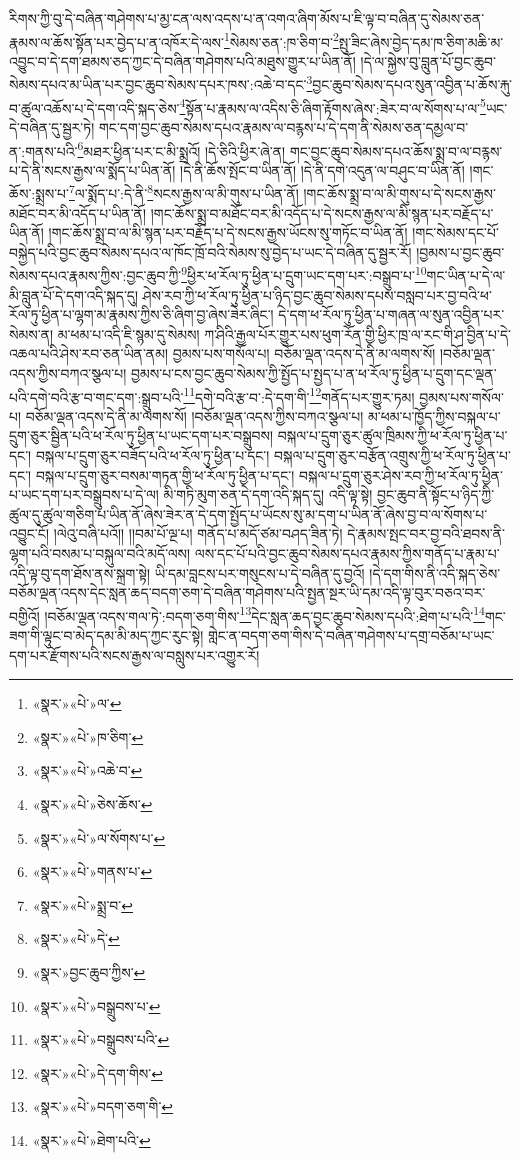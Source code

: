 རིགས་ཀྱི་བུ་དེ་བཞིན་གཤེགས་པ་མྱ་ངན་ལས་འདས་པ་ན་འགའ་ཞིག་མོས་པ་ཇི་ལྟ་བ་བཞིན་དུ་སེམས་ཅན་རྣམས་ལ་ཆོས་སྟོན་པར་བྱེད་པ་ན་འཁོར་དེ་ལས་\footnote{«སྣར་»«པེ་»ལ་}སེམས་ཅན་:ཁ་ཅིག་བ་\footnote{«སྣར་»«པེ་»ཁ་ཅིག་}སྤུ་ཟིང་ཞེས་བྱེད་དམ་ཁ་ཅིག་མཆི་མ་འབྱུང་བ་དེ་དག་ཐམས་ཅད་ཀྱང་དེ་བཞིན་གཤེགས་པའི་མཐུས་གྱུར་པ་ཡིན་ནོ། །དེ་ལ་སྐྱེས་བུ་བླུན་པོ་བྱང་ཆུབ་སེམས་དཔའ་མ་ཡིན་པར་བྱང་ཆུབ་སེམས་དཔར་ཁས་:འཆེ་བ་དང་\footnote{«སྣར་»«པེ་»འཆེ་བ་}བྱང་ཆུབ་སེམས་དཔའ་སུན་འབྱིན་པ་ཆོས་རྐུ་བ་ཚུལ་འཆོས་པ་དེ་དག་འདི་སྐད་ཅེས་\footnote{«སྣར་»«པེ་»ཅེས་ཆོས་}སྟོན་པ་རྣམས་ལ་འདིས་ཅི་ཞིག་རྟོགས་ཞེས་:ཟེར་བ་ལ་སོགས་པ་ལ་\footnote{«སྣར་»«པེ་»ལ་སོགས་པ་}ཡང་དེ་བཞིན་དུ་སྦྱར་ཏེ། གང་དག་བྱང་ཆུབ་སེམས་དཔའ་རྣམས་ལ་བརྙས་པ་དེ་དག་ནི་སེམས་ཅན་དམྱལ་བ་ན་:གནས་པའི་\footnote{«སྣར་»«པེ་»གནས་པ་}མཐར་ཕྱིན་པར་ང་མི་སྨྲའོ། །དེ་ཅིའི་ཕྱིར་ཞེ་ན། གང་བྱང་ཆུབ་སེམས་དཔའ་ཆོས་སྨྲ་བ་ལ་བརྙས་པ་དེ་ནི་སངས་རྒྱས་ལ་སྨོད་པ་ཡིན་ནོ། །དེ་ནི་ཆོས་སྤོང་བ་ཡིན་ནོ། །དེ་ནི་དགེ་འདུན་ལ་བཤུང་བ་ཡིན་ནོ། །གང་ཆོས་:སྨྲས་པ་\footnote{«སྣར་»«པེ་»སྨྲ་བ་}ལ་སྨོད་པ་:དེ་ནི་\footnote{«སྣར་»«པེ་»དེ་}སངས་རྒྱས་ལ་མི་གུས་པ་ཡིན་ནོ། །གང་ཆོས་སྨྲ་བ་ལ་མི་གུས་པ་དེ་སངས་རྒྱས་མཐོང་བར་མི་འདོད་པ་ཡིན་ནོ། །གང་ཆོས་སྨྲ་བ་མཐོང་བར་མི་འདོད་པ་དེ་སངས་རྒྱས་ལ་མི་སྙན་པར་བརྗོད་པ་ཡིན་ནོ། །གང་ཆོས་སྨྲ་བ་ལ་མི་སྙན་པར་བརྗོད་པ་དེ་སངས་རྒྱས་ཡོངས་སུ་གཏོང་བ་ཡིན་ནོ། །གང་སེམས་དང་པོ་བསྐྱེད་པའི་བྱང་ཆུབ་སེམས་དཔའ་ལ་ཁོང་ཁྲོ་བའི་སེམས་སུ་བྱེད་པ་ཡང་དེ་བཞིན་དུ་སྦྱར་རོ། །བྱམས་པ་བྱང་ཆུབ་སེམས་དཔའ་རྣམས་ཀྱིས་:བྱང་ཆུབ་ཀྱི་\footnote{«སྣར་»བྱང་ཆུབ་ཀྱིས་}ཕྱིར་ཕ་རོལ་ཏུ་ཕྱིན་པ་དྲུག་ཡང་དག་པར་:བསྒྲུབ་པ་\footnote{«སྣར་»«པེ་»བསྒྲུབས་པ་}གང་ཡིན་པ་དེ་ལ་མི་བླུན་པོ་དེ་དག་འདི་སྐད་དུ། ཤེས་རབ་ཀྱི་ཕ་རོལ་ཏུ་ཕྱིན་པ་ཉིད་བྱང་ཆུབ་སེམས་དཔས་བསླབ་པར་བྱ་བའི་ཕ་རོལ་ཏུ་ཕྱིན་པ་ལྷག་མ་རྣམས་ཀྱིས་ཅི་ཞིག་བྱ་ཞེས་ཟེར་ཞིང་། དེ་དག་ཕ་རོལ་ཏུ་ཕྱིན་པ་གཞན་ལ་སུན་འབྱིན་པར་སེམས་ན། མ་ཕམ་པ་འདི་ཇི་སྙམ་དུ་སེམས། ཀ་ཤིའི་རྒྱལ་པོར་གྱུར་པས་ཕུག་རོན་གྱི་ཕྱིར་ཁྲ་ལ་རང་གི་ཤ་བྱིན་པ་དེ་འཆལ་པའི་ཤེས་རབ་ཅན་ཡིན་ནམ། བྱམས་པས་གསོལ་པ། བཅོམ་ལྡན་འདས་དེ་ནི་མ་ལགས་སོ། །བཅོམ་ལྡན་འདས་ཀྱིས་བཀའ་སྩལ་པ། བྱམས་པ་ངས་བྱང་ཆུབ་སེམས་ཀྱི་སྤྱོད་པ་སྤྱད་པ་ན་ཕ་རོལ་ཏུ་ཕྱིན་པ་དྲུག་དང་ལྡན་པའི་དགེ་བའི་རྩ་བ་གང་དག་:སྒྲུབ་པའི་\footnote{«སྣར་»«པེ་»བསྒྲུབས་པའི་}དགེ་བའི་རྩ་བ་:དེ་དག་གི་\footnote{«སྣར་»«པེ་»དེ་དག་གིས་}གནོད་པར་གྱུར་ཏམ། བྱམས་པས་གསོལ་པ། བཅོམ་ལྡན་འདས་དེ་ནི་མ་ལགས་སོ། །བཅོམ་ལྡན་འདས་ཀྱིས་བཀའ་སྩལ་པ། མ་ཕམ་པ་ཁྱོད་ཀྱིས་བསྐལ་པ་དྲུག་ཅུར་སྦྱིན་པའི་ཕ་རོལ་ཏུ་ཕྱིན་པ་ཡང་དག་པར་བསྒྲུབས། བསྐལ་པ་དྲུག་ཅུར་ཚུལ་ཁྲིམས་ཀྱི་ཕ་རོལ་ཏུ་ཕྱིན་པ་དང་། བསྐལ་པ་དྲུག་ཅུར་བཟོད་པའི་ཕ་རོལ་ཏུ་ཕྱིན་པ་དང་། བསྐལ་པ་དྲུག་ཅུར་བརྩོན་འགྲུས་ཀྱི་ཕ་རོལ་ཏུ་ཕྱིན་པ་དང་། བསྐལ་པ་དྲུག་ཅུར་བསམ་གཏན་གྱི་ཕ་རོལ་ཏུ་ཕྱིན་པ་དང་། བསྐལ་པ་དྲུག་ཅུར་ཤེས་རབ་ཀྱི་ཕ་རོལ་ཏུ་ཕྱིན་པ་ཡང་དག་པར་བསྒྲུབས་པ་དེ་ལ། མི་གཏི་མུག་ཅན་དེ་དག་འདི་སྐད་དུ། འདི་ལྟ་སྟེ། བྱང་ཆུབ་ནི་སྟོང་པ་ཉིད་ཀྱི་ཚུལ་དུ་ཚུལ་གཅིག་པ་ཡིན་ནོ་ཞེས་ཟེར་ན་དེ་དག་སྤྱོད་པ་ཡོངས་སུ་མ་དག་པ་ཡིན་ནོ་ཞེས་བྱ་བ་ལ་སོགས་པ་འབྱུང་ངོ། །ལེའུ་བཞི་པའོ།། །།བམ་པོ་ལྔ་པ། གནོད་པ་མདོ་ཙམ་བཤད་ཟིན་ཏེ། དེ་རྣམས་སྤང་བར་བྱ་བའི་ཐབས་ནི་ལྷག་པའི་བསམ་པ་བསྐུལ་བའི་མདོ་ལས། ལས་དང་པོ་པའི་བྱང་ཆུབ་སེམས་དཔའ་རྣམས་ཀྱིས་གནོད་པ་རྣམ་པ་འདི་ལྟ་བུ་དག་ཐོས་ནས་སྐྲག་སྟེ། ཡི་དམ་བླངས་པར་གསུངས་པ་དེ་བཞིན་དུ་བྱའོ། །དེ་དག་གིས་ནི་འདི་སྐད་ཅེས་བཅོམ་ལྡན་འདས་དེང་སླན་ཆད་བདག་ཅག་དེ་བཞིན་གཤེགས་པའི་སྤྱན་སྔར་ཡི་དམ་འདི་ལྟ་བུར་བཅའ་བར་བགྱིའོ། །བཅོམ་ལྡན་འདས་གལ་ཏེ་:བདག་ཅག་གིས་\footnote{«སྣར་»«པེ་»བདག་ཅག་གི་}དེང་སླན་ཆད་བྱང་ཆུབ་སེམས་དཔའི་:ཐེག་པ་པའི་\footnote{«སྣར་»«པེ་»ཐེག་པའི་}གང་ཟག་གི་ལྟུང་བ་མེད་དམ་མི་མད་ཀྱང་རུང་སྟེ། གླེང་ན་བདག་ཅག་གིས་དེ་བཞིན་གཤེགས་པ་དགྲ་བཅོམ་པ་ཡང་དག་པར་རྫོགས་པའི་སངས་རྒྱས་ལ་བསླུས་པར་འགྱུར་རོ། 